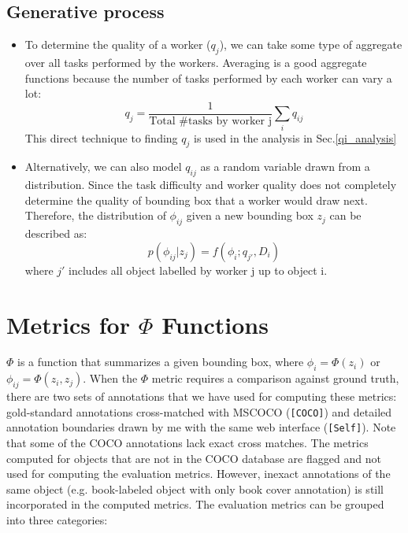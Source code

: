 \documentclass[12pt]{article}
\begin{document}
\subsection{Generative process}
\begin{itemize}
\item To determine the quality of a worker ($q_j$), we can take some type of aggregate over all tasks performed by the workers. Averaging is a good aggregate functions because the number of tasks performed by each worker can vary a lot:
\begin{equation}
q_j = \frac{1}{\text{Total \# tasks by worker j}}\sum_i q_{ij}
\end{equation}
This direct technique to finding $q_j$ is used in the analysis in Sec.\ref{qi_analysis}
\item Alternatively, we can also model $q_{ij}$ as a random variable drawn from a distribution. Since the task difficulty and worker quality does not  completely determine the quality of bounding box that a worker would draw next. Therefore, the distribution of $\phi_{ij}$ given a new bounding box $z_{j}$ can be described as:
\begin{equation}
p(\phi_{ij}|z_{j}) = f(\phi_i;q_{j'},D_i)
\end{equation}
where $j'$ includes all object labelled by worker j up to object i.
\end{itemize}

\section{Metrics for $\Phi$ Functions}
\par $\Phi$ is a function that summarizes a given bounding box, where $\phi_i=\Phi(z_i)$ or $\phi_{ij}=\Phi(z_i,z_j)$. When the $\Phi$ metric requires a comparison against ground truth, there are two sets of annotations that we have used for computing these metrics: gold-standard annotations cross-matched with MSCOCO (\texttt{[COCO]}) and detailed annotation boundaries drawn by me with the same web interface (\texttt{[Self]}). Note that some of the COCO annotations lack exact cross matches. The metrics computed for objects that are not in the COCO database are flagged and not used for computing the evaluation metrics. However, inexact annotations of the same object (e.g. book-labeled object with only book cover annotation) is still incorporated in the computed metrics. The evaluation metrics can be grouped into three categories: 
\end{document}
